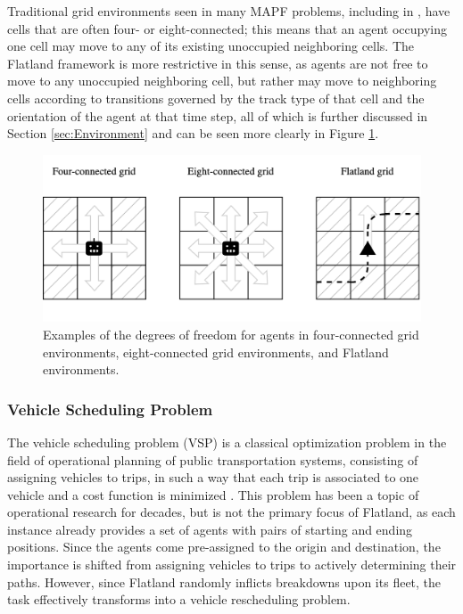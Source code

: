 \documentclass[11pt]{article}
\begin{document}
Traditional grid environments seen in many MAPF problems, including in \cite{standley10a}, have cells that are often four- or eight-connected; this means that an agent occupying one cell may move to any of its existing unoccupied neighboring cells.  The Flatland framework is more restrictive in this sense, as agents are not free to move to any unoccupied neighboring cell, but rather may move to neighboring cells according to transitions governed by the track type of that cell and the orientation of the agent at that time step, all of which is further discussed in Section \ref{sec:Environment} and can be seen more clearly in Figure \ref{fig:grids}.

\begin{figure}[t]
\label{fig:grids}
\includegraphics[width=\textwidth]{grids}
\caption{Examples of the degrees of freedom for agents in four-connected grid environments, eight-connected grid environments, and Flatland environments.}
\centering
\end{figure}

\subsubsection{Vehicle Scheduling Problem}
The vehicle scheduling problem (VSP) is a classical optimization problem in the field of operational planning of public transportation systems, consisting of assigning vehicles to trips, in such a way that each trip is associated to one vehicle and a cost function is minimized \cite{bapeukfa00a}.  This problem has been a topic of operational research for decades, but is not the primary focus of Flatland, as each instance already provides a set of agents with pairs of starting and ending positions. Since the agents come pre-assigned to the origin and destination, the importance is shifted from assigning vehicles to trips to actively determining their paths.  However, since Flatland randomly inflicts breakdowns upon its fleet, the task effectively transforms into a vehicle rescheduling problem.
\end{document}
